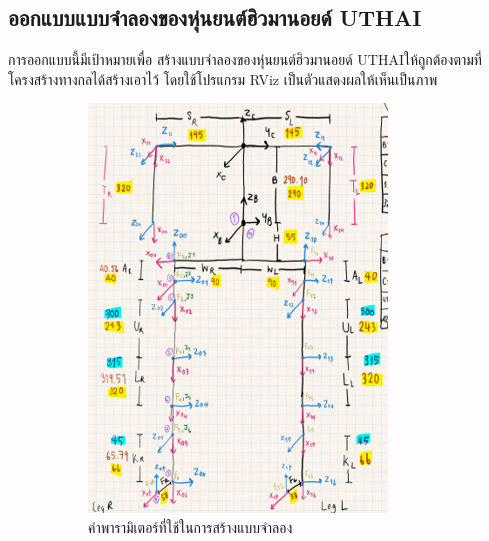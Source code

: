 
\subsection{ออกแบบแบบจำลองของหุ่นยนต์ฮิวมานอยด์ UTHAI}
การออกแบบนี้มีเป้าหมายเพื่อ สร้างแบบจำลองของหุ่นยนต์ฮิวมานอยด์ UTHAIให้ถูกต้องตามที่โครงสร้างทางกลได้สร้างเอาไว้
โดยใช้โปรแกรม RViz เป็นตัวแสดงผลให้เห็นเป็นภาพ
\begin{figure}[!ht]
    \centering
    \begin{subfigure}[b]{0.4\textwidth}
        \centering
        \includegraphics[width=\textwidth]{chapter3/images/uthai_sk.png}
        \caption{ค่าพารามิเตอร์ที่ใช้ในการสร้างแบบจำลอง}
    \end{subfigure}
    \hfill
    \begin{subfigure}[b]{0.5\textwidth}
        \centering

\end{subfigure}
\end{figure}
